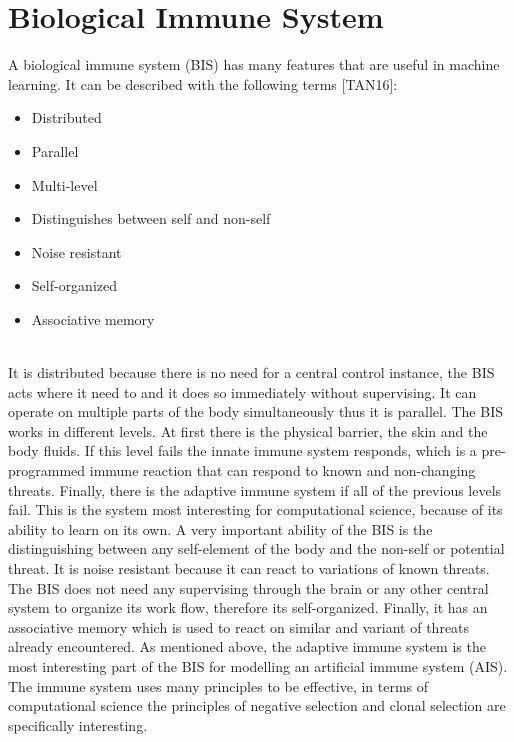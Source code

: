 %
%
% 
% 
% 


\chapter{Biological Immune System}
\label{chap:bis}

A biological immune system (BIS) has many features that are useful in machine learning. It can be described with the following terms [TAN16]:
\begin{itemize}
	\item 	Distributed
	\item 	Parallel
	\item 	Multi-level
	\item 	Distinguishes between self and non-self
	\item 	Noise resistant
	\item 	Self-organized
	\item 	Associative memory
	
\end{itemize}\\

It is distributed because there is no need for a central control instance, the BIS acts where it need to and it does so immediately without supervising. It can operate on multiple parts of the body simultaneously thus it is parallel. The BIS works in different levels. At first there is the physical barrier, the skin and the body fluids. If this level fails the innate immune system responds, which is a pre-programmed immune reaction that can respond to known and non-changing threats. Finally, there is the adaptive immune system if all of the previous levels fail. This is the system most interesting for computational science, because of its ability to learn on its own. A very important ability of the BIS is the distinguishing between any self-element of the body and the non-self or potential threat. It is noise resistant because it can react to variations of known threats. The BIS does not need any supervising through the brain or any other central system to organize its work flow, therefore its self-organized. Finally, it has an associative memory which is used to react on similar and variant of threats already encountered.
As mentioned above, the adaptive immune system is the most interesting part of the BIS for modelling an artificial immune system (AIS). The immune system uses many principles to be effective, in terms of computational science the principles of negative selection and clonal selection are specifically interesting.

